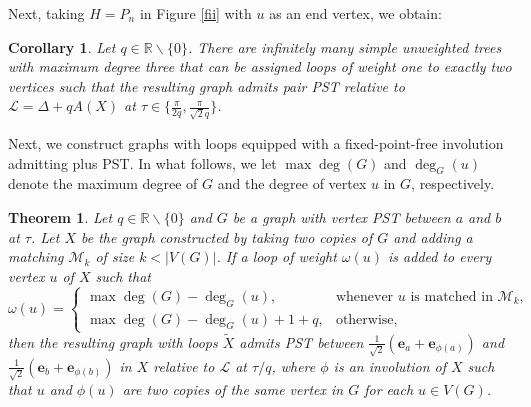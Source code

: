 \documentclass[12pt,a4paper]{article}
\newtheorem{thm}{Theorem}
\newtheorem{cor}{Corollary}
\def \e {{\mathbf e}}
\begin{document}
Next, taking $H=P_n$ in Figure \ref{fii} with $u$ as an end vertex, we obtain:

\begin{cor}
Let $q\in\mathbb{R}\backslash\{0\}$. There are infinitely many simple unweighted trees with maximum degree three that can be assigned loops of weight one to exactly two vertices such that the resulting graph admits pair PST relative to $\mathscr{L}=\Delta+qA(X)$ at $\tau\in\{\frac{\pi}{2q},\frac{\pi}{\sqrt{2}q}\}$.
\end{cor}

Next, we construct graphs with loops equipped with a fixed-point-free involution admitting plus PST. In what follows, we let $\max\operatorname{deg}(G)$ and $\operatorname{deg}_G(u)$ denote the maximum degree of $G$ and the degree of vertex $u$ in $G$, respectively.

\begin{thm}
\label{pluspst}
Let $q\in\mathbb{R}\backslash\{0\}$ and $G$ be a graph with vertex PST between $a$ and $b$ at $\tau$. Let $X$ be the graph constructed by taking two copies of $G$ and adding a matching $\mathcal{M}_k$ of size $k<|V(G)|$. If a loop of weight $\omega(u)$ is added to every vertex $u$ of $X$ such that 
\begin{equation*}
\omega(u)=\begin{cases}
\max\operatorname{deg}(G)-\operatorname{deg}_G(u),& \text{whenever $u$ is matched in $\mathcal{M}_k$},\\
\max\operatorname{deg}(G)-\operatorname{deg}_G(u)+1+q,& \text{otherwise},
\end{cases}
\end{equation*}
then the resulting graph with loops $\widetilde{X}$ admits 
PST between $\frac{1}{\sqrt{2}}(\e_a+\e_{\phi(a)})$ and $\frac{1}{\sqrt{2}}(\e_b+\e_{\phi(b)})$ in $X$ relative to $\mathscr{L}$ at $\tau/q$, where $\phi$ is an involution of $X$ such that $u$ and $\phi(u)$ are two copies of the same vertex in $G$ for each $u\in V(G)$.
\end{thm}
\end{document}
